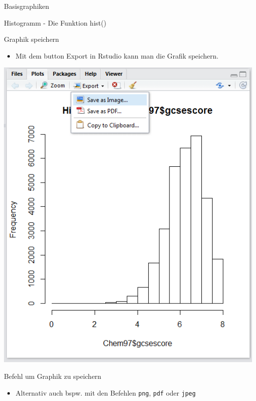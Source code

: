 \documentclass[ignorenonframetext,]{beamer}
\newenvironment{Shaded}{}{}
\newcommand{\KeywordTok}[1]{\textcolor[rgb]{0.00,0.44,0.13}{\textbf{{#1}}}}
\newcommand{\StringTok}[1]{\textcolor[rgb]{0.25,0.44,0.63}{{#1}}}
\newcommand{\NormalTok}[1]{{#1}}
\providecommand{\tightlist}{%
\setlength{\itemsep}{0pt}\setlength{\parskip}{0pt}}
\begin{document}
\begin{frame}[fragile]{Basisgraphiken}
\begin{block}{Histogramm - Die Funktion hist()}
\end{block}

\begin{block}{Graphik speichern}

\begin{itemize}
\tightlist
\item
  Mit dem button Export in Rstudio kann man die Grafik speichern.
\end{itemize}

\includegraphics{./tex2pdf.9796/c841157f024cc7a3d01009eeb5c876036fad5d81.png}

\end{block}

\begin{block}{Befehl um Graphik zu speichern}

\begin{itemize}
\tightlist
\item
  Alternativ auch bspw. mit den Befehlen \texttt{png}, \texttt{pdf} oder
  \texttt{jpeg}
\end{itemize}

\begin{Shaded}
\end{Shaded}


\end{block}
\end{frame}
\end{document}
